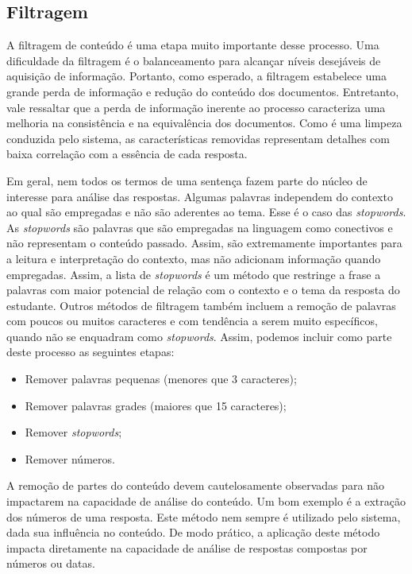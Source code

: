 \subsection{Filtragem}
A filtragem de conteúdo é uma etapa muito importante desse processo. Uma dificuldade da filtragem é o balanceamento para alcançar níveis desejáveis de aquisição de informação. Portanto, como esperado, a filtragem estabelece uma grande perda de informação e redução do conteúdo dos documentos. Entretanto, vale ressaltar que a perda de informação inerente ao processo caracteriza uma melhoria na consistência e na equivalência dos documentos. Como é uma limpeza conduzida pelo sistema, as características removidas representam detalhes com baixa correlação com a essência de cada resposta.

Em geral, nem todos os termos de uma sentença fazem parte do núcleo de interesse para análise das respostas. Algumas palavras independem do contexto ao qual são empregadas e não são aderentes ao tema. Esse é o caso das \textit{stopwords}. As \textit{stopwords} são palavras que são empregadas na linguagem como conectivos e não representam o conteúdo passado. Assim, são extremamente importantes para a leitura e interpretação do contexto, mas não adicionam informação quando empregadas. Assim, a lista de \textit{stopwords} é um método que restringe a frase a palavras com maior potencial de relação com o contexto e o tema da resposta do estudante. Outros métodos de filtragem também incluem a remoção de palavras com poucos ou muitos caracteres e com tendência a serem muito específicos, quando não se enquadram como \textit{stopwords}. Assim, podemos incluir como parte deste processo as seguintes etapas:

\begin{itemize}
	\item Remover palavras pequenas (menores que 3 caracteres);
	\item Remover palavras grades (maiores que 15 caracteres);
	\item Remover \textit{stopwords};
	\item Remover números.
\end{itemize}

A remoção de partes do conteúdo devem cautelosamente observadas para não impactarem na capacidade de análise do conteúdo. Um bom exemplo é a extração dos números de uma resposta. Este método nem sempre é utilizado pelo sistema, dada sua influência no conteúdo. De modo prático, a aplicação deste método impacta diretamente na capacidade de análise de respostas compostas por números ou datas. 

